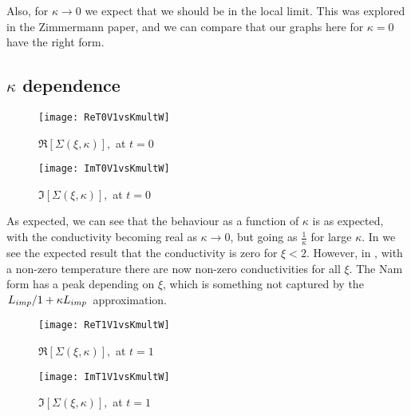 \documentclass[11pt]{article}
\begin{document}
Also, for $\kappa \rightarrow 0$ we expect that we should be in the local limit.
This was explored in the Zimmermann paper, and we can compare that our graphs here for $\kappa = 0$ have the right form. 

\subsection{$\kappa$ dependence} \label{subsec:NamForm.Graph.KDep}
\begin{figure}[htp]
	\centering
	\texttt{[image: ReT0V1vsKmultW]}
	\caption{$\Re[\Sigma(\xi, \kappa)],$ at $t = 0$} \label{fig:ReT0V1vsKmultW}
\end{figure}
\begin{figure}[htp]
	\centering
	\texttt{[image: ImT0V1vsKmultW]}
	\caption{$\Im[\Sigma(\xi, \kappa)],$ at $t = 0$} \label{fig:ImT0V1vsKmultW}
\end{figure}

As expected, we can see that the behaviour as a function of $\kappa$ is as expected, with the conductivity becoming real as $\kappa \rightarrow 0$, but going as $\frac{1}{\kappa}$ for large $\kappa$.
In  we see the expected result that the conductivity is zero for $\xi < 2$.
However, in , with a non-zero temperature there are now non-zero conductivities for all $\xi$.
The Nam form has a peak depending on $\xi$, which is something not captured by the $\flatfrac{L_{imp}}{1 + \kappa L_{imp}}$ approximation.
\begin{figure}[htp]
	\centering
	\texttt{[image: ReT1V1vsKmultW]}
	\caption{$\Re[\Sigma(\xi, \kappa)],$ at $t = 1$} \label{fig:ReT1V1vsKmultW}
\end{figure}
\begin{figure}[htp]
	\centering
	\texttt{[image: ImT1V1vsKmultW]}
	\caption{$\Im[\Sigma(\xi, \kappa)],$ at $t = 1$} \label{fig:ImT1V1vsKmultW}
\end{figure}

\end{document}
